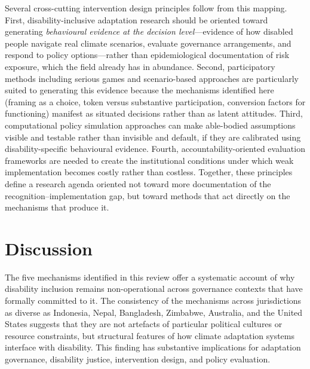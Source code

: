 \documentclass[12pt,a4paper]{article}
\begin{document}
Several cross-cutting intervention design principles follow from this mapping. First, disability-inclusive adaptation research should be oriented toward generating \textit{behavioural evidence at the decision level}---evidence of how disabled people navigate real climate scenarios, evaluate governance arrangements, and respond to policy options---rather than epidemiological documentation of risk exposure, which the field already has in abundance. Second, participatory methods including serious games and scenario-based approaches are particularly suited to generating this evidence because the mechanisms identified here (framing as a choice, token versus substantive participation, conversion factors for functioning) manifest as situated decisions rather than as latent attitudes. Third, computational policy simulation approaches can make able-bodied assumptions visible and testable rather than invisible and default, if they are calibrated using disability-specific behavioural evidence. Fourth, accountability-oriented evaluation frameworks are needed to create the institutional conditions under which weak implementation becomes costly rather than costless. Together, these principles define a research agenda oriented not toward more documentation of the recognition--implementation gap, but toward methods that act directly on the mechanisms that produce it.


\section*{Discussion}

The five mechanisms identified in this review offer a systematic account of why disability inclusion remains non-operational across governance contexts that have formally committed to it. The consistency of the mechanisms across jurisdictions as diverse as Indonesia, Nepal, Bangladesh, Zimbabwe, Australia, and the United States suggests that they are not artefacts of particular political cultures or resource constraints, but structural features of how climate adaptation systems interface with disability. This finding has substantive implications for adaptation governance, disability justice, intervention design, and policy evaluation.
\end{document}
